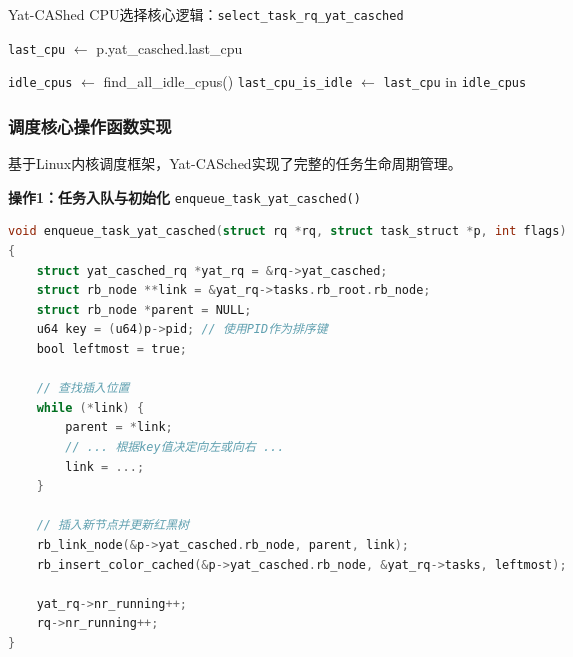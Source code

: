 \begin{algorithm}[!htb]
    \caption{Yat-CAShed CPU选择核心逻辑：\texttt{select\_task\_rq\_yat\_casched}}
    \label{alg:cpu_selection}
    
    \BlankLine
    \texttt{last\_cpu} $\leftarrow$ p.yat\_casched.last\_cpu\;
    
    \BlankLine
    \texttt{idle\_cpus} $\leftarrow$ find\_all\_idle\_cpus()\;
    \texttt{last\_cpu\_is\_idle} $\leftarrow$ \texttt{last\_cpu} in \texttt{idle\_cpus}\;
    
    
    \BlankLine
    
    \BlankLine
    
    \BlankLine
    \; 
\end{algorithm}

\subsubsection{调度核心操作函数实现}
基于Linux内核调度框架，Yat-CASched实现了完整的任务生命周期管理。

\textbf{操作1：任务入队与初始化} \hfill \texttt{enqueue\_task\_yat\_casched()}
\begin{tcolorbox} [enhanced, colback=teal!5, colframe=teal!40!black, leftrule=3mm, rightrule=0mm, toprule=0mm, bottomrule=0mm, arc=2mm, left=5mm, right=5mm, top=3mm, bottom=3mm, fonttitle=\bfseries, title=\textbf{任务入队处理}]
\begin{lstlisting}[language=C, basicstyle=\footnotesize\fontfamily{zi4}\selectfont, showstringspaces=false]
void enqueue_task_yat_casched(struct rq *rq, struct task_struct *p, int flags)
{
    struct yat_casched_rq *yat_rq = &rq->yat_casched;
    struct rb_node **link = &yat_rq->tasks.rb_root.rb_node;
    struct rb_node *parent = NULL;
    u64 key = (u64)p->pid; // 使用PID作为排序键
    bool leftmost = true;

    // 查找插入位置
    while (*link) {
        parent = *link;
        // ... 根据key值决定向左或向右 ...
        link = ...;
    }

    // 插入新节点并更新红黑树
    rb_link_node(&p->yat_casched.rb_node, parent, link);
    rb_insert_color_cached(&p->yat_casched.rb_node, &yat_rq->tasks, leftmost);
    
    yat_rq->nr_running++;
    rq->nr_running++;
}
\end{lstlisting}
\end{tcolorbox}

